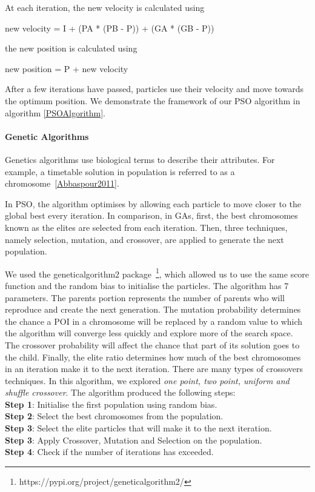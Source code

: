 At each
iteration, the new velocity is calculated using
\begin{center}
    new velocity = I + (PA * (PB - P)) + (GA * (GB - P))
\end{center}

the new position is calculated using
\begin{center}
    new position = P + new velocity 
\end{center}

After a few iterations have passed, particles use
their velocity and move towards the optimum position.
We demonstrate the framework of our PSO algorithm in
algorithm \ref{PSOAlgorithm}.


\paragraph{Genetic Algorithms}

Genetics algorithms use biological terms to describe
their attributes. For example, a timetable solution in
population is referred to as a chromosome~\ref{Abbaspour2011}. 

In PSO, the algorithm optimises by allowing each
particle to move closer to the global best every
iteration. In comparison, in GAs, first, the best
chromosomes known as the elites are selected from each
iteration. Then, three techniques, namely selection,
mutation, and crossover, are applied to generate the
next population.

We used the geneticalgorithm2 package~\footnote{https://pypi.org/project/geneticalgorithm2/},
which allowed us to use the same score function and
the random bias to initialise the particles. The
algorithm has 7 parameters. The parents portion
represents the number of parents who will reproduce
and create the next generation. The mutation
probability determines the chance a POI in a
chromosome will be replaced by a random value to which
the algorithm will converge less quickly and explore
more of the search space. The crossover probability
will affect the chance that part of its solution goes
to the child. Finally, the elite ratio determines how
much of the best chromosomes in an iteration make it
to the next iteration.  There are many types of
crossovers techniques. In this algorithm, we
explored \textit{one point, two point, uniform and shuffle crossover}.  The algorithm produced the following
steps: \\
\textbf{Step 1}: Initialise the first population using random bias. \\
\textbf{Step 2}: Select the best chromosomes from the population. \\ 
\textbf{Step 3}: Select the elite particles that will make it to the next iteration.\\
\textbf{Step 3}: Apply Crossover, Mutation and Selection on the population. \\
\textbf{Step 4}: Check if the number of iterations has exceeded. 


